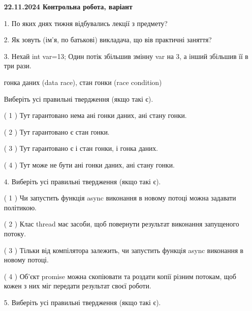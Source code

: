 \documentclass[12pt, ukrainian]{article}
\begin{document}
\vspace{4mm}
\newpage
\begin {large}

\textbf{22.11.2024 Контрольна робота, варіант  }\par


{
1. По яких днях тижня відбувались лекції з предмету?



\vspace{5mm}
2. Як зовуть (ім'я, по батькові) викладача, що вів практичні заняття?



\vspace{5mm}
3. Нехай int var=13; Один потік збільшив змінну var на 3, а інший збільшив її в три рази.

гонка даних (data race), стан гонки (race condition)

Виберіть усі правильні твердження (якщо такі є).\par
\vspace{2mm}
( 1 ) Тут гарантовано нема ані гонки даних, ані стану гонки.%

( 2 ) Тут гарантовано є стан гонки.%

( 3 ) Тут гарантовано є і стан гонки, і гонка даних.%

( 4 ) Тут може не бути ані гонки даних, ані стану гонки.%


\vspace{5mm}
4. Виберіть усі правильні твердження (якщо такі є).\par
\vspace{2mm}

( 1 ) Чи запустить функція  async виконання в новому потоці можна задавати політикою.%

( 2 ) Клас thread має засоби, щоб повернути результат виконання запущеного потоку.%

( 3 ) Тільки від компілятора залежить, чи запустить функція async виконання в новому потоці.%

( 4 ) Об’єкт promise можна скопіювати та роздати копії різним потокам, щоб кожен з них міг передати результат своєї роботи.%


\vspace{5mm}
5. Виберіть усі правильні твердження (якщо такі є).\par
\vspace{2mm}

}
\end{large}
\end{document}
